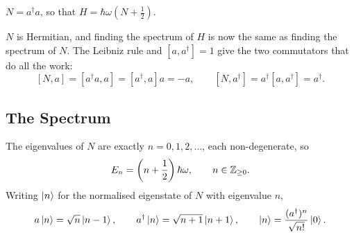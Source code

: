 \documentclass[a4paper]{scrartcl}
\begin{document}
\begin{definition}
    $N = a^\dagger a$, so that $H = \hbar\omega\left(N + \frac{1}{2}\right)$.
\end{definition}

$N$ is Hermitian, and finding the spectrum of $H$ is now the same as finding the spectrum of $N$. The Leibniz rule and $[a,a^\dagger]=1$ give the two commutators that do all the work:
$$
[N, a] = [a^\dagger a, a] = [a^\dagger, a] a = -a, \qquad [N, a^\dagger] = a^\dagger [a, a^\dagger] = a^\dagger.
$$

\subsection{The Spectrum}

\begin{theorem}
    The eigenvalues of $N$ are exactly $n = 0, 1, 2, \dots$, each non-degenerate, so
    $$
    E_n = \left(n + \frac{1}{2}\right)\hbar\omega, \qquad n \in \mathbb{Z}_{\geq 0}.
    $$
    Writing $\ket{n}$ for the normalised eigenstate of $N$ with eigenvalue $n$,
    $$
    a\ket{n} = \sqrt{n}\ket{n-1}, \qquad a^\dagger \ket{n} = \sqrt{n+1}\ket{n+1}, \qquad \ket{n} = \frac{(a^\dagger)^n}{\sqrt{n!}}\ket{0}.
    $$
\end{theorem}
\end{document}

